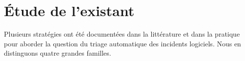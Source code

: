 
\section{Étude de l’existant}
Plusieurs stratégies ont été documentées dans la littérature et dans la pratique pour aborder la question du triage automatique des incidents logiciels. Nous en distinguons quatre grandes familles.
